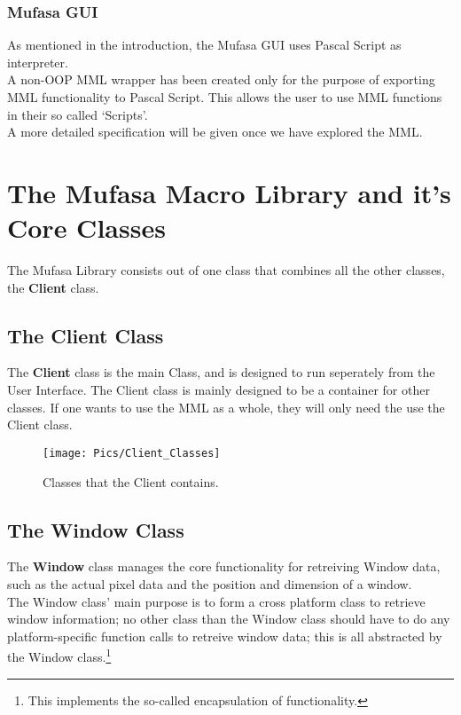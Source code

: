\documentclass[a4paper, 10pt]{report} %
\begin{document}
\subsection{Mufasa GUI}

As mentioned in the introduction, the Mufasa GUI uses Pascal Script as 
interpreter. \\ 

A non-OOP MML wrapper has been created only for the purpose
of exporting MML functionality to Pascal Script. 
This allows the user to use MML functions in their so called `Scripts'. \\
A more detailed specification will be given once we have explored the MML.

\chapter{The Mufasa Macro Library and it's Core Classes}

The Mufasa Library consists out of one class that combines all the other
classes, the \textbf{Client} class.

\section{The Client Class}

The \textbf{Client} class is the main Class, and is designed 
to run seperately from the User Interface.
The Client class is mainly designed to be a container for other classes.
If one wants to use the MML as a whole, they will only need the use 
the Client class.

\begin{figure}[ht]
	\texttt{[image: Pics/Client\_Classes]}
	\caption{Classes that the Client contains.}
\end{figure}

\pagebreak

\section{The Window Class}

The \textbf{Window} class manages the core functionality for retreiving Window data,
such as the actual pixel data and the position and dimension of a window. \\

The Window class' main purpose is to form a cross platform class to retrieve
window information; no other class than the Window class should have to do
any platform-specific function calls to retreive window data; this is all
abstracted by the Window class.\footnote{This implements the so-called 
encapsulation of functionality.} \\
\end{document}
